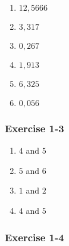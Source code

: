 {\begin{multicols}{3}
\begin{enumerate}[noitemsep, label=\textbf{\arabic*}. ]
 \item $12,5666$%
\item $3,317$%
\item $0,267$%
\item $1,913$
\item $6,325$%
\item $0,056$%
\end{enumerate}

\subsubsection*{Exercise 1-3} %

\begin{enumerate}[noitemsep, label=\textbf{\arabic*}. ]
\item $4$ and $5$%
\item $5$ and $6$%
\item $1$ and $2$%
\item $4$ and $5$%

\end{enumerate}

\subsubsection*{Exercise 1-4} %



\end{multicols}}

